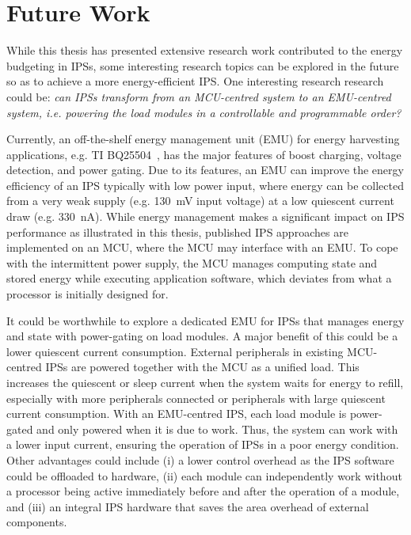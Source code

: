 \section{Future Work}

While this thesis has presented extensive research work contributed to the energy budgeting in IPSs, some interesting research topics can be explored in the future so as to achieve a more energy-efficient IPS. 
One interesting research research could be: \textit{can IPSs transform from an MCU-centred system to an EMU-centred system, i.e. powering the load modules in a controllable and programmable order?} 

Currently, an off-the-shelf energy management unit (EMU) for energy harvesting applications, e.g. TI BQ25504~\cite{bq25504}, has the major features of boost charging, voltage detection, and power gating.
Due to its features, an EMU can improve the energy efficiency of an IPS typically with low power input, where energy can be collected from a very weak supply (e.g. \SI{130}{\milli\volt} input voltage) at a low quiescent current draw (e.g. \SI{330}{\nano\ampere}). 
While energy management makes a significant impact on IPS performance as illustrated in this thesis, published IPS approaches are implemented on an MCU, where the MCU may interface with an EMU.
To cope with the intermittent power supply, the MCU manages computing state and stored energy while executing application software, which deviates from what a processor is initially designed for. 

It could be worthwhile to explore a dedicated EMU for IPSs that manages energy and state with power-gating on load modules.
A major benefit of this could be a lower quiescent current consumption. %
External peripherals in existing MCU-centred IPSs are powered together with the MCU as a unified load.
This increases the quiescent or sleep current when the system waits for energy to refill, especially with more peripherals connected or peripherals with large quiescent current consumption. 
With an EMU-centred IPS, each load module is power-gated and only powered when it is due to work. 
Thus, the system can work with a lower input current, ensuring the operation of IPSs in a poor energy condition. 
Other advantages could include (i) a lower control overhead as the IPS software could be offloaded to hardware, (ii) each module can independently work without a processor being active immediately before and after the operation of a module, and (iii) an integral IPS hardware that saves the area overhead of external components. 

